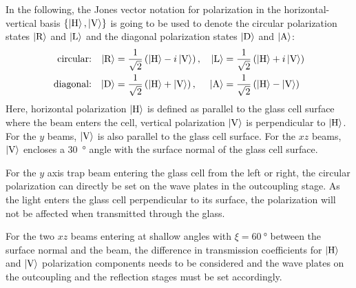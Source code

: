 In the following, the Jones vector notation for polarization in the horizontal-vertical basis $\{\Ket{\text{H}}, \Ket{\text{V}}\}$ is going to be used to denote the circular polarization states $\Ket{\text{R}}$ and $\Ket{\text{L}}$ and the diagonal polarization states $\Ket{\text{D}}$ and $\Ket{\text{A}}$:
\begin{align}
        \text{circular:} && \Ket{\text{R}} &= \frac{1}{\sqrt{2}} \left(\Ket{\text{H}} - i \Ket{\text{V}}\right),  & \Ket{\text{L}} &= \frac{1}{\sqrt{2}} \left(\Ket{\text{H}} + i \Ket{\text{V}}\right) \\
        \text{diagonal:} && \Ket{\text{D}} &= \frac{1}{\sqrt{2}} \left(\Ket{\text{H}} + \Ket{\text{V}}\right),  &  \Ket{\text{A}} &= \frac{1}{\sqrt{2}} \left(\Ket{\text{H}} - \Ket{\text{V}}\right)
\end{align}
Here, horizontal polarization $\Ket{\text{H}}$ is defined as parallel to the glass cell surface  where the beam enters the cell, vertical polarization $\Ket{\text{V}}$ is perpendicular to $\Ket{\text{H}}$. For the $y$ beams, $\Ket{\text{V}}$ is also parallel to the glass cell surface. For the $xz$ beams, $\Ket{\text{V}}$ encloses a \SI{30}{\degree} angle with the surface normal of the glass cell surface.

For the $y$ axis trap beam entering the glass cell from the left or right, the circular polarization can directly be set on the wave plates in the outcoupling stage. As the light enters the glass cell perpendicular to its surface, the polarization will not be affected when transmitted through the glass.

For the two $xz$ beams entering at shallow angles with $\xi = \SI{60}{\degree}$ between the surface normal and the beam, the difference in transmission coefficients for $\Ket{\text{H}}$ and $\Ket{\text{V}}$ polarization components needs to be considered and the wave plates on the outcoupling and the reflection stages must be set accordingly.

